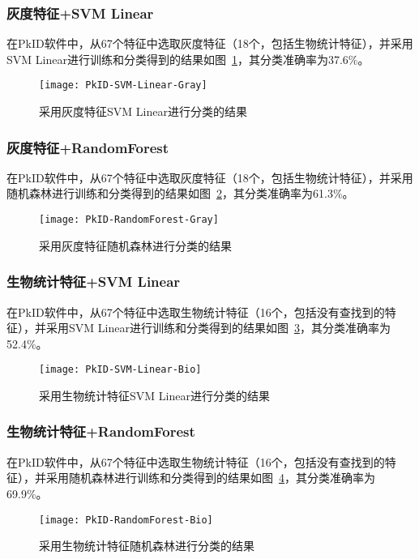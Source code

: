 \subsubsection{灰度特征+SVM Linear}
在PkID软件中，从67个特征中选取灰度特征（18个，包括生物统计特征），并采用SVM Linear进行训练和分类得到的结果如图~\ref{fig:PkID-SVM-Linear-Gray}，其分类准确率为37.6\%。
\begin{figure}[!ht]
\centering
\texttt{[image: PkID-SVM-Linear-Gray]}
\caption{采用灰度特征SVM Linear进行分类的结果}
\label{fig:PkID-SVM-Linear-Gray}
\end{figure}

\subsubsection{灰度特征+RandomForest}
在PkID软件中，从67个特征中选取灰度特征（18个，包括生物统计特征），并采用随机森林进行训练和分类得到的结果如图~\ref{fig:PkID-RandomForest-Gray}，其分类准确率为61.3\%。
\begin{figure}[!ht]
\centering
\texttt{[image: PkID-RandomForest-Gray]}
\caption{采用灰度特征随机森林进行分类的结果}
\label{fig:PkID-RandomForest-Gray}
\end{figure}

\subsubsection{生物统计特征+SVM Linear}
在PkID软件中，从67个特征中选取生物统计特征（16个，包括没有查找到的特征），并采用SVM Linear进行训练和分类得到的结果如图~\ref{fig:PkID-SVM-Linear-Bio}，其分类准确率为52.4\%。
\begin{figure}[!ht]
\centering
\texttt{[image: PkID-SVM-Linear-Bio]}
\caption{采用生物统计特征SVM Linear进行分类的结果}
\label{fig:PkID-SVM-Linear-Bio}
\end{figure}

\subsubsection{生物统计特征+RandomForest}
在PkID软件中，从67个特征中选取生物统计特征（16个，包括没有查找到的特征），并采用随机森林进行训练和分类得到的结果如图~\ref{fig:PkID-RandomForest-Bio}，其分类准确率为69.9\%。
\begin{figure}[!ht]
\centering
\texttt{[image: PkID-RandomForest-Bio]}
\caption{采用生物统计特征随机森林进行分类的结果}
\label{fig:PkID-RandomForest-Bio}
\end{figure}

